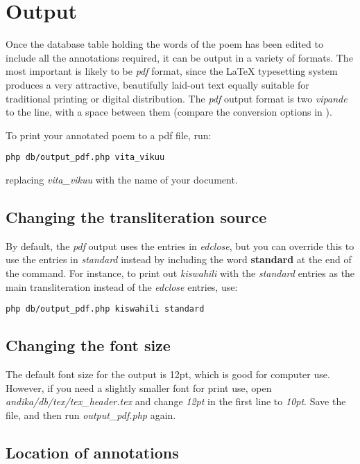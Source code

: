 \section{Output}
\label{s:output}

Once the database table holding the words of the poem has been edited to include all the annotations required, it can be output in a variety of formats.  The most important is likely to be \textit{pdf} format, since the LaTeX typesetting system produces a very attractive, beautifully laid-out text equally suitable for traditional printing or digital distribution.  The \textit{pdf} output format is two \textit{vipande} to the line, with a space between them (compare the conversion options in ).

To print your annotated poem to a pdf file, run:

\verb|php db/output_pdf.php vita_vikuu|

replacing \textit{vita_vikuu} with the name of your document.


\subsection{Changing the transliteration source}

By default, the \textit{pdf} output uses the entries in \textit{edclose}, but you can override this to use the entries in \textit{standard} instead by including the word \textbf{standard} at the end of the command.  For instance, to print out \textit{kiswahili} with the \textit{standard} entries as the main transliteration instead of the \textit{edclose} entries, use:

\verb|php db/output_pdf.php kiswahili standard|


\subsection{Changing the font size}
\label{s:outfont}

The default font size for the output is 12pt, which is good for computer use.  However, if you need a slightly smaller font for print use, open \textit{andika/db/tex/tex_header.tex} and change \textit{12pt} in the first line to \textit{10pt}.  Save the file, and then run \textit{output_pdf.php} again.

\subsection{Location of annotations}
\label{s:outloc}


